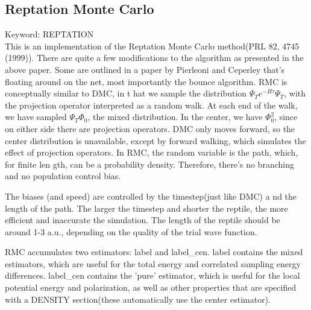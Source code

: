 \documentclass[12pt]{article}
\begin{document}
\newpage

\subsection{Reptation Monte Carlo}
Keyword: REPTATION \\

This is an implementation of the Reptation Monte Carlo method(PRL 82, 4745 (1999)).  There are quite a few modifications to the algorithm as presented in the above paper. 
 Some are outlined in a paper by Pierleoni and Ceperley that's floating around on the net, most importantly the bounce algorithm.  RMC is conceptually similar to DMC, in t
hat we sample the distribution $\Psi_T e^{-H\tau} \Psi_T $, with the projection operator interpreted as a random walk.  At each end of the walk, we have sampled $\Psi_T \Phi_0$, the mixed distribution.  In the center, we have $\Phi_0^2$, since on either side there are projection operators.  DMC only moves forward, so the center 
distribution is unavailable, except by forward walking, which simulates the effect of projection operators.  In RMC, the random variable is the path, which, for finite len
gth, can be a probability density.  Therefore, there's no branching and no population control bias.  


The biases (and speed) are controlled by the timestep(just like DMC) a
nd the length of the path.  The larger the timestep and shorter the reptile, the more efficient and inaccurate the simulation. The length of the reptile should be 
around 1-3 a.u., depending on the quality of the trial wave function.

RMC accumulates two estimators: label and label\_cen.  label contains the 
mixed estimators, which are useful for the total energy and correlated
sampling energy differences.  
label\_cen contains the 'pure' estimator, which is useful for the local 
potential energy and polarization, as well as other properties that 
are specified with a DENSITY section(these automatically use the 
center estimator).
\end{document}
